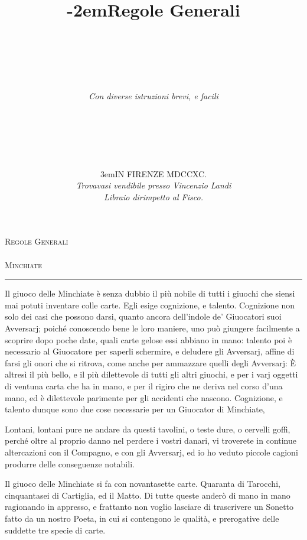 \documentclass[11pt,a6paper]{article}
\title{\kern -2em\fontshape{sc}\LARGE Regole Generali\\ \fontsize{20}{18}\selectfont{
del giuoco}\\ \normalsize \textls[1000]{delle}\\ \fontsize{34}{34}\selectfont{\textls[100]{MINCHIATE}}}
\author{%
  \vspace{-26pt}\\
\textit{Con diverse istruzioni brevi, e facili}\\
\textit{\textls[86]{per bene imparare a giuocarlo}}\vspace{4pt}\\
\fontshape{sc}\fontsize{10}{34}\selectfont{\textls[350]{ed in fine}}\\
  \fontshape{sc}\fontsize{14}{34}\selectfont{\textls[10]{aggiuntavi un ottava}}\\
  \fontshape{sc}\fontsize{10}{34}\selectfont{sopra la maniera}\\
  \fontshape{sc}\fontsize{14}{34}\selectfont{di alzare le carte}\vspace{72pt}\\}
\date{%
  \kern 3em\small IN FIRENZE MDCCXC.\\ \sepline
  \textit{Trovavasi vendibile presso Vincenzio Landi\\
Libraio dirimpetto al Fisco.}}
\newcommand{\supersection}[1]{%
\clearpage
    {\scshape \centering \huge #1\\}
    \vspace{6pt}
    \hrule
    \vspace{12pt}
}
\begin{document}

\maketitle



\supersection{Regole Generali\\ \\ Minchiate}

Il giuoco delle Minchiate è
senza dubbio il più nobile di 
tutti i giuochi che siensi mai
potuti inventare colle carte.
Egli esige cognizione, e talento. Cognizione non solo dei casi che possono darsi, quanto ancora dell'indole de' Giuocatori suoi Avversarj; poiché conoscendo bene le loro maniere, uno può giungere facilmente a scoprire dopo poche date, quali carte gelose essi abbiano in mano: talento poi è necessario al Giuocatore per saperli schermire, e deludere gli Avversarj, affine di farsi gli onori che si ritrova, come anche per ammazzare quelli degli Avversarj: È altresì il più bello, e il più dilettevole di tutti gli altri giuochi, e per i varj oggetti di ventuna carta che ha in mano, e per il rigiro che ne deriva nel corso d'una mano, ed è dilettevole parimente per gli accidenti che nascono. Cognizione, e talento dunque sono due cose necessarie per un Giuocator di Minchiate,

Lontani, lontani pure ne andare da questi tavolini, o teste dure, o cervelli goffi, perché oltre al proprio danno nel perdere i vostri danari, vi troverete in continue altercazioni con il Compagno, e con gli Avversarj, ed io ho veduto piccole cagioni produrre delle conseguenze notabili.

Il giuoco delle Minchiate si fa con novantasette carte. Quaranta di Tarocchi, cinquantasei di Cartiglia, ed il Matto. Di tutte queste anderò di mano in mano ragionando in appresso, e frattanto non voglio lasciare di trascrivere un Sonetto fatto da un nostro Poeta, in cui si contengono le qualità, e prerogative delle suddette tre specie di carte.

\clearpage
\end{document}
